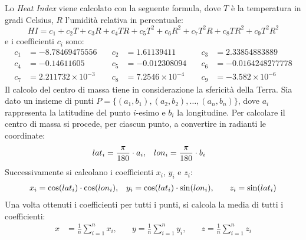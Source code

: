 Lo \textit{Heat Index} viene calcolato con la seguente formula, dove $T$ è la temperatura in gradi Celsius, $R$ l'umidità relativa in percentuale:
\[
	HI = c_1 + c_2 T + c_3 R + c_4 TR + c_5 T^2 + c_6 R^2 + c_7 T^2 R + c_8 TR^2 + c_9 T^2 R^2
\]
e i coefficienti $c_i$ sono:
\begin{align*}
	c_1 & = -8.78469475556          & \quad c_2 & = 1.61139411            & \quad c_3 & = 2.33854883889         \\
	c_4 & = -0.14611605             & \quad c_5 & = -0.012308094          & \quad c_6 & = -0.0164248277778      \\
	c_7 & = 2.211732 \times 10^{-3} & \quad c_8 & = 7.2546 \times 10^{-4} & \quad c_9 & = -3.582 \times 10^{-6}
\end{align*}
Il calcolo del centro di massa tiene in considerazione la sfericità della Terra. Sia dato un insieme di punti $P = \{(a_1, b_1), (a_2, b_2), \ldots, (a_n, b_n)\}$, dove $a_i$ rappresenta
la latitudine del punto $i$-esimo e $b_i$ la longitudine. Per calcolare il centro di massa si procede, per ciascun punto, a convertire in radianti le coordinate:
\begin{align*}
	{lat}_i = \frac{\pi}{180} \cdot a_i, & \quad {lon}_i = \frac{\pi}{180} \cdot b_i
\end{align*}
Successivamente si calcolano i coefficienti $x_i$, $y_i$ e $z_i$:
\begin{align*}
	x_i = \cos({lat}_i) \cdot \cos({lon}_i),       &
	\quad y_i = \cos({lat}_i) \cdot \sin({lon}_i), &
	\quad z_i = \sin({lat}_i)
\end{align*}
Una volta ottenuti i coefficienti per tutti i punti, si calcola la media di tutti i coefficienti:
\begin{align*}
	x & = \frac{1}{n} \sum_{i=1}^{n} x_i, & \quad y = \frac{1}{n} \sum_{i=1}^{n} y_i, & \quad z = \frac{1}{n} \sum_{i=1}^{n} z_i
\end{align*}

